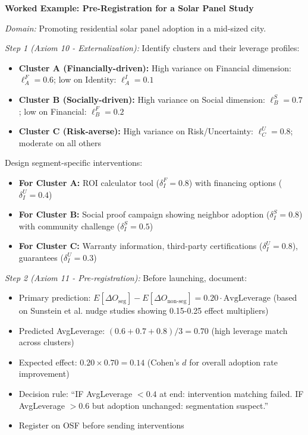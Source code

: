\textbf{Worked Example: Pre-Registration for a Solar Panel Study}

\textit{Domain:} Promoting residential solar panel adoption in a mid-sized city.

\textit{Step 1 (Axiom 10 - Externalization):} Identify clusters and their leverage profiles:
\begin{itemize}[nosep]
\item \textbf{Cluster A (Financially-driven):} High variance on Financial dimension: $\ell_A^{F} = 0.6$; low on Identity: $\ell_A^{I} = 0.1$
\item \textbf{Cluster B (Socially-driven):} High variance on Social dimension: $\ell_B^{S} = 0.7$; low on Financial: $\ell_B^{F} = 0.2$
\item \textbf{Cluster C (Risk-averse):} High variance on Risk/Uncertainty: $\ell_C^{U} = 0.8$; moderate on all others
\end{itemize}

Design segment-specific interventions:
\begin{itemize}[nosep]
\item \textbf{For Cluster A:} ROI calculator tool ($\delta_I^{F} = 0.8$) with financing options ($\delta_I^{U} = 0.4$)
\item \textbf{For Cluster B:} Social proof campaign showing neighbor adoption ($\delta_I^{S} = 0.8$) with community challenge ($\delta_I^{S} = 0.5$)
\item \textbf{For Cluster C:} Warranty information, third-party certifications ($\delta_I^{U} = 0.8$), guarantees ($\delta_I^{U} = 0.3$)
\end{itemize}

\textit{Step 2 (Axiom 11 - Pre-registration):} Before launching, document:
\begin{itemize}[nosep]
\item Primary prediction: $E[\Delta O_{\text{seg}}] - E[\Delta O_{\text{non-seg}}] = 0.20 \cdot \text{AvgLeverage}$ (based on Sunstein et al. nudge studies showing 0.15-0.25 effect multipliers)
\item Predicted AvgLeverage: $(0.6 + 0.7 + 0.8) / 3 = 0.70$ (high leverage match across clusters)
\item Expected effect: $0.20 \times 0.70 = 0.14$ (Cohen's $d$ for overall adoption rate improvement)
\item Decision rule: ``IF AvgLeverage $< 0.4$ at end: intervention matching failed. IF AvgLeverage $> 0.6$ but adoption unchanged: segmentation suspect.''
\item Register on OSF before sending interventions
\end{itemize}

